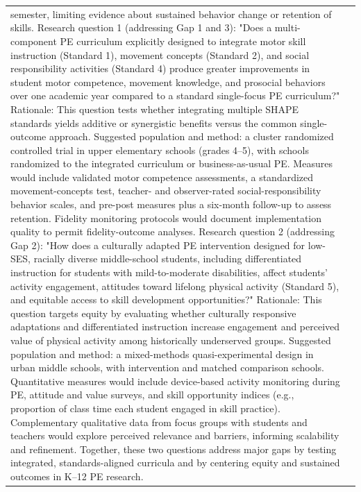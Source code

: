 \begin{longtable}{@{}l p{12.5cm}@{}}
semester, limiting evidence about sustained behavior change or retention of skills. \newline Research question 1 (addressing Gap 1 and 3): "Does a multi-component PE curriculum explicitly designed to integrate motor skill instruction (Standard 1), movement concepts (Standard 2), and social responsibility activities (Standard 4) produce greater improvements in student motor competence, movement knowledge, and prosocial behaviors over one academic year compared to a standard single-focus PE curriculum?" Rationale: This question tests whether integrating multiple SHAPE standards yields additive or synergistic benefits versus the common single-outcome approach. Suggested population and method: a cluster randomized controlled trial in upper elementary schools (grades 4--5), with schools randomized to the integrated curriculum or business-as-usual PE. Measures would include validated motor competence assessments, a standardized movement-concepts test, teacher- and observer-rated social-responsibility behavior scales, and pre-post measures plus a six-month follow-up to assess retention. Fidelity monitoring protocols would document implementation quality to permit fidelity-outcome analyses. \newline Research question 2 (addressing Gap 2): "How does a culturally adapted PE intervention designed for low-SES, racially diverse middle-school students, including differentiated instruction for students with mild-to-moderate disabilities, affect students' activity engagement, attitudes toward lifelong physical activity (Standard 5), and equitable access to skill development opportunities?" Rationale: This question targets equity by evaluating whether culturally responsive adaptations and differentiated instruction increase engagement and perceived value of physical activity among historically underserved groups. Suggested population and method: a mixed-methods quasi-experimental design in urban middle schools, with intervention and matched comparison schools. Quantitative measures would include device-based activity monitoring during PE, attitude and value surveys, and skill opportunity indices (e.g., proportion of class time each student engaged in skill practice). Complementary qualitative data from focus groups with students and teachers would explore perceived relevance and barriers, informing scalability and refinement. Together, these two questions address major gaps by testing integrated, standards-aligned curricula and by centering equity and sustained outcomes in K--12 PE research. \\

\end{longtable}
